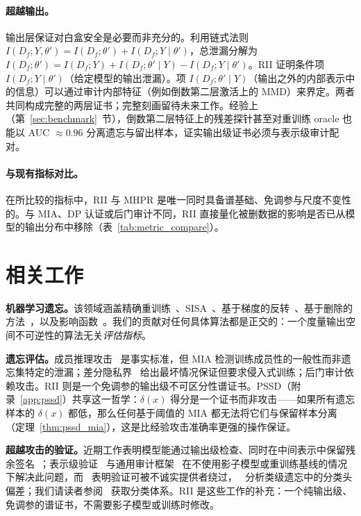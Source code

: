 \paragraph{超越输出。}
输出层保证对白盒安全是必要而非充分的。利用链式法则 $I(D_f;Y,\theta') = I(D_f;\theta') + I(D_f;Y\mid\theta')$，总泄漏分解为 $I(D_f;\theta') = I(D_f;Y) + I(D_f;\theta'\mid Y) - I(D_f;Y\mid\theta')$。RII 证明条件项 $I(D_f;Y\mid\theta')$（给定模型的输出泄漏）。项 $I(D_f;\theta'\mid Y)$（输出之外的内部表示中的信息）可以通过审计内部特征（例如倒数第二层激活上的 MMD）来界定。两者共同构成完整的两层证书；完整刻画留待未来工作。经验上（第~\ref{sec:benchmark}~节），倒数第二层特征上的残差探针甚至对重训练 oracle 也能以 AUC ${\approx}0.96$ 分离遗忘与留出样本，证实输出级证书必须与表示级审计配对。

\paragraph{与现有指标对比。}
在所比较的指标中，RII 与 MHPR 是唯一同时具备谱基础、免调参与尺度不变性的。与 MIA、DP 认证或后门审计不同，RII 直接量化被删数据的影响是否已从模型的输出分布中移除（表~\ref{tab:metric_compare}）。

\section{相关工作}
\label{sec:related}

\textbf{机器学习遗忘。}该领域涵盖精确重训练~\cite{cao2015towards}、SISA~\cite{bourtoule2021machine}、基于梯度的反转~\cite{golatkar2020eternal}、基于删除的方法~\cite{ginart2019making,sekhari2021remember}，以及影响函数~\cite{guo2020certified}。我们的贡献对任何具体算法都是正交的：一个度量输出空间不可逆性的算法无关\emph{评估指标}。

\textbf{遗忘评估。}成员推理攻击~\cite{shokri2017membership,carlini2022membership} 是事实标准，但 MIA 检测训练成员性的一般性而非遗忘集特定的泄漏；差分隐私界~\cite{guo2020certified} 给出最坏情况保证但要求侵入式训练；后门审计依赖攻击。RII 则是一个免调参的输出级不可区分性谱证书。PSSD（附录~\ref{app:pssd}）共享这一哲学：$\delta(x)$ 得分是一个证书而非攻击——如果所有遗忘样本的 $\delta(x)$ 都低，那么任何基于阈值的 MIA 都无法将它们与保留样本分离（定理~\ref{thm:pssd_mia}），这是比经验攻击准确率更强的操作保证。

\textbf{超越攻击的验证。}近期工作表明模型能通过输出级检查、同时在中间表示中保留残余签名~\cite{cosma2026ruler,yong2026erased}；表示级验证~\cite{cosma2026ruler} 与通用审计框架~\cite{ye2026auditing} 在不使用影子模型或重训练基线的情况下解决此问题，而~\cite{zhang2024fragile} 表明验证可被不诚实提供者绕过，~\cite{zheng2026bias} 分析类级遗忘中的分类头偏差；我们请读者参阅~\cite{xue2026verification} 获取分类体系。RII 是这些工作的补充：一个纯输出级、免调参的谱证书，不需要影子模型或训练时修改。


